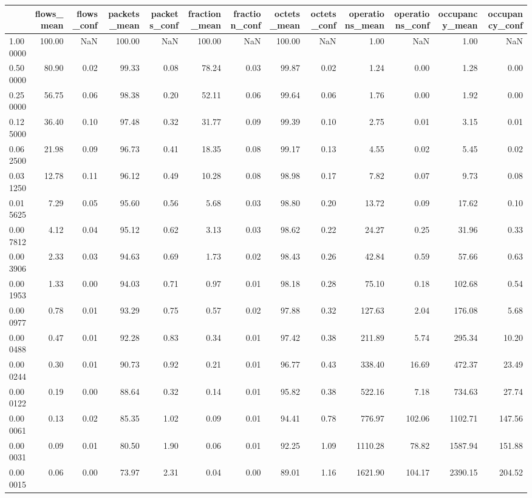 \begin{tabular}{lrrrrrrrrrrrr}
\toprule
 & flows_mean & flows_conf & packets_mean & packets_conf & fraction_mean & fraction_conf & octets_mean & octets_conf & operations_mean & operations_conf & occupancy_mean & occupancy_conf \\
\midrule
1.000000 & 100.00 & NaN & 100.00 & NaN & 100.00 & NaN & 100.00 & NaN & 1.00 & NaN & 1.00 & NaN \\
0.500000 & 80.90 & 0.02 & 99.33 & 0.08 & 78.24 & 0.03 & 99.87 & 0.02 & 1.24 & 0.00 & 1.28 & 0.00 \\
0.250000 & 56.75 & 0.06 & 98.38 & 0.20 & 52.11 & 0.06 & 99.64 & 0.06 & 1.76 & 0.00 & 1.92 & 0.00 \\
0.125000 & 36.40 & 0.10 & 97.48 & 0.32 & 31.77 & 0.09 & 99.39 & 0.10 & 2.75 & 0.01 & 3.15 & 0.01 \\
0.062500 & 21.98 & 0.09 & 96.73 & 0.41 & 18.35 & 0.08 & 99.17 & 0.13 & 4.55 & 0.02 & 5.45 & 0.02 \\
0.031250 & 12.78 & 0.11 & 96.12 & 0.49 & 10.28 & 0.08 & 98.98 & 0.17 & 7.82 & 0.07 & 9.73 & 0.08 \\
0.015625 & 7.29 & 0.05 & 95.60 & 0.56 & 5.68 & 0.03 & 98.80 & 0.20 & 13.72 & 0.09 & 17.62 & 0.10 \\
0.007812 & 4.12 & 0.04 & 95.12 & 0.62 & 3.13 & 0.03 & 98.62 & 0.22 & 24.27 & 0.25 & 31.96 & 0.33 \\
0.003906 & 2.33 & 0.03 & 94.63 & 0.69 & 1.73 & 0.02 & 98.43 & 0.26 & 42.84 & 0.59 & 57.66 & 0.63 \\
0.001953 & 1.33 & 0.00 & 94.03 & 0.71 & 0.97 & 0.01 & 98.18 & 0.28 & 75.10 & 0.18 & 102.68 & 0.54 \\
0.000977 & 0.78 & 0.01 & 93.29 & 0.75 & 0.57 & 0.02 & 97.88 & 0.32 & 127.63 & 2.04 & 176.08 & 5.68 \\
0.000488 & 0.47 & 0.01 & 92.28 & 0.83 & 0.34 & 0.01 & 97.42 & 0.38 & 211.89 & 5.74 & 295.34 & 10.20 \\
0.000244 & 0.30 & 0.01 & 90.73 & 0.92 & 0.21 & 0.01 & 96.77 & 0.43 & 338.40 & 16.69 & 472.37 & 23.49 \\
0.000122 & 0.19 & 0.00 & 88.64 & 0.32 & 0.14 & 0.01 & 95.82 & 0.38 & 522.16 & 7.18 & 734.63 & 27.74 \\
0.000061 & 0.13 & 0.02 & 85.35 & 1.02 & 0.09 & 0.01 & 94.41 & 0.78 & 776.97 & 102.06 & 1102.71 & 147.56 \\
0.000031 & 0.09 & 0.01 & 80.50 & 1.90 & 0.06 & 0.01 & 92.25 & 1.09 & 1110.28 & 78.82 & 1587.94 & 151.88 \\
0.000015 & 0.06 & 0.00 & 73.97 & 2.31 & 0.04 & 0.00 & 89.01 & 1.16 & 1621.90 & 104.17 & 2390.15 & 204.52 \\

\end{tabular}
